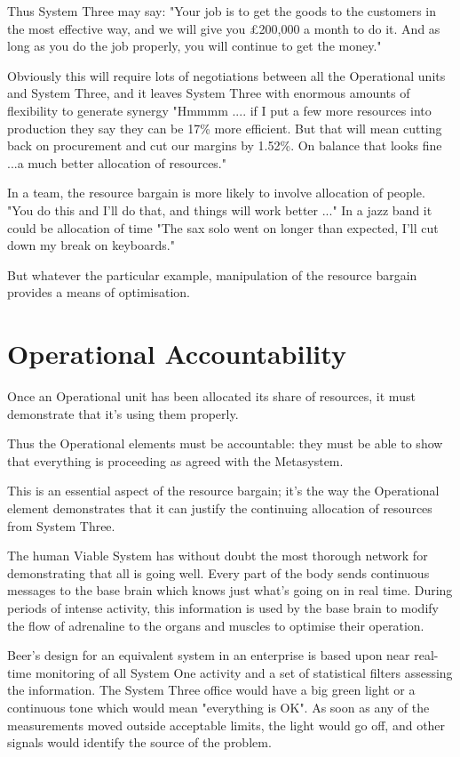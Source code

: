 Thus System Three may say: "Your job is to get the goods to the customers in the most effective way, and we will give you £200,000 a month to do it. And as long as you do the job properly, you will continue to get the money."

Obviously this will require lots of negotiations between all the Operational units and System Three, and it leaves System Three with enormous amounts of flexibility to generate synergy "Hmmmm .... if I put a few more resources into production they say they can be 17\% more efficient. But that will mean cutting back on procurement and cut our margins by 1.52\%. On balance that looks fine ...a much better allocation of resources."

In a team, the resource bargain is more likely to involve allocation of people. "You do this and I'll do that, and things will work better ..." In a jazz band it could be allocation of time "The sax solo went on longer than expected, I'll cut down my break on keyboards."

But whatever the particular example, manipulation of the resource bargain provides a means of optimisation.

\section*{Operational Accountability}
Once an Operational unit has been allocated its share of resources, it must demonstrate that it's using them properly.

Thus the Operational elements must be accountable: they must be able to show that everything is proceeding as agreed with the Metasystem.

This is an essential aspect of the resource bargain; it's the way the Operational element demonstrates that it can justify the continuing allocation of resources from System Three.

The human Viable System has without doubt the most thorough network for demonstrating that all is going well. Every part of the body sends continuous messages to the base brain which knows just what's going on in real time. During periods of intense activity, this information is used by the base brain to modify the flow of adrenaline to the organs and muscles to optimise their operation.

Beer's design for an equivalent system in an enterprise is based upon near real-time monitoring of all System One activity and a set of statistical filters assessing the information. The System Three office would have a big green light or a continuous tone which would mean "everything is OK". As soon as any of the measurements moved outside acceptable limits, the light would go off, and other signals would identify the source of the problem.

